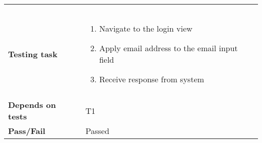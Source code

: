 \begin{appendices}
\begin{table}[H]
\begin{tabular}{ | l | l  |}
\begin{minipage}{5in}
\begin{itemize}[noitemsep]
			\end{itemize} \end{minipage}
			 \\ &\\[-3.8ex]\hline&\\[-3.8ex]
			\textbf{Testing task} & \begin{minipage}{5in}
			\begin{enumerate}[noitemsep]
			\item Navigate to the login view
			\item Apply email address to the email input field
			\item Receive response from system
			\end{enumerate}\end{minipage}
			 \\ &\\[-3.8ex]\hline
			\textbf{Depends on tests} & T1 \\ \hline					
			\textbf{Pass/Fail} & Passed \\\hline
		\end{tabular}
	
	\label{Tab_systemTesting2}
	\end{table}


\end{appendices}
